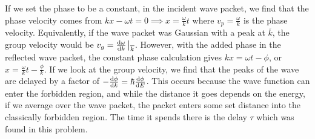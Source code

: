 \documentclass[a4paper,twoside]{article}
\begin{document}
\begin{itemize}
\begin{problem}
            If we set the phase to be a constant, in the incident wave packet, we find that the phase velocity comes from  $ kx - \omega t = 0 \implies x = \frac{\omega}{k} t $ where $ v_p = \frac{\omega}{k} $ is the phase velocity. Equivalently, if the wave packet was Gaussian with a peak at $ \overline{k} $, the group velocity would be $ v_g = \dv{\omega}{k}\eval_{ \overline{k}} $. However, with the added phase in the reflected wave packet, the constant phase calculation gives $ kx = \omega t - \phi $, or $ x = \frac{\omega}{k} t - \frac{\phi}{k} $. If we look at the group velocity, we find that the peaks of the wave are delayed by a factor of $ -\dv{\phi}{k} = \hbar\dv{\phi}{E} $. This occurs because the wave function can enter the forbidden region, and while the distance it goes depends on the energy, if we average over the wave packet, the packet enters some set distance into the classically forbidden region. The time it spends there is the delay $ \tau $ which was found in this problem.
        \end{problem}
\end{itemize}
\end{document}

